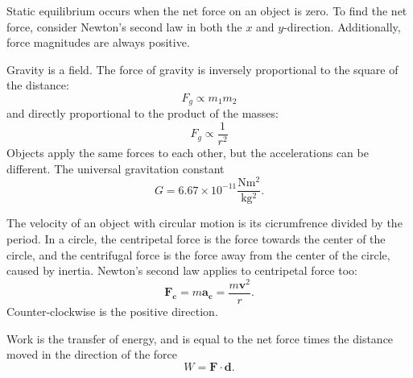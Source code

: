 \documentclass{article}
\begin{document}
Static equilibrium occurs when the net force on an object is zero.
To find the net force, consider Newton's second law in both the $x$ and $y$-direction. 
Additionally, force magnitudes are always positive. 

Gravity is a field. The force of gravity is inversely proportional to the square of the distance:
\[
F_g \propto m_1m_2 
\]
and directly proportional to the product of the masses:
\[
F_g \propto \frac{1}{r^2}
\]
Objects apply the same forces to each other, but the accelerations can be different.
The universal gravitation constant 
\[
G = 6.67 \times 10^{-11} \frac{\mathrm{Nm^2}}{\mathrm{kg^2}}.
\] 

The velocity of an object with circular motion is its cicrumfrence divided by the period.
In a circle, the centripetal force is the force towards the center of the circle,
and the centrifugal force is the force away from the center of the circle, caused by inertia.
Newton's second law applies to centripetal force too:
\[
\mathbf{F_c} = m\mathbf{a_c} = \frac{m\mathbf{v}^2}{r}.
\]
Counter-clockwise is the positive direction. 

Work is the transfer of energy, and is equal to the net force times the distance moved in the direction of the force
\[
W = \mathbf{F \cdot d}. 
\]
\end{document}
